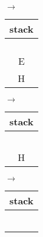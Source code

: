 \documentclass[12pt]{article}
\newenvironment{problem}[2][Problem]{\begin{trivlist}
\item[\hskip \labelsep {\bfseries #1}\hskip \labelsep {\bfseries #2.}]}{\end{trivlist}}
\begin{document}
\begin{problem}{3}
\begin{tabular}[b]{|c|}
\end{tabular}
$\rightarrow$
\begin{tabular}[b]{|c|} 
    \hline
    stack \\
    \hline
    \\
    \hline
    \\
    \hline
    \\
    \hline
    \\
    \hline
    E\\
    \hline
    H\\
    \hline
\end{tabular}
$\rightarrow$
\begin{tabular}[b]{|c|} 
    \hline
    stack \\
    \hline
    \\
    \hline
    \\
    \hline
    \\
    \hline
    \\
    \hline
    \\
    \hline
    H\\
    \hline
\end{tabular}
$\rightarrow$
\begin{tabular}[b]{|c|} 
    \hline
    stack \\
    \hline
    \\
    \hline
    \\
    \hline
    \\
    \hline
    \\
    \hline
    \\
    \hline
    \\
    \hline
\end{tabular}
\end{problem}
\pagebreak
\end{document}

